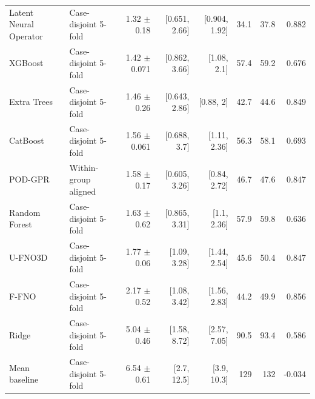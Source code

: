 \begin{landscape}
\begin{longtable}{p{3.8cm}p{2.9cm}rrrrrr}
Latent Neural Operator & Case-disjoint 5-fold & 1.32 $\pm$ 0.18 & [0.651, 2.66] & [0.904, 1.92] & 34.1 & 37.8 & 0.882 \\
XGBoost & Case-disjoint 5-fold & 1.42 $\pm$ 0.071 & [0.862, 3.66] & [1.08, 2.1] & 57.4 & 59.2 & 0.676 \\
Extra Trees & Case-disjoint 5-fold & 1.46 $\pm$ 0.26 & [0.643, 2.86] & [0.88, 2] & 42.7 & 44.6 & 0.849 \\
CatBoost & Case-disjoint 5-fold & 1.56 $\pm$ 0.061 & [0.688, 3.7] & [1.11, 2.36] & 56.3 & 58.1 & 0.693 \\
POD-GPR & Within-group aligned & 1.58 $\pm$ 0.17 & [0.605, 3.26] & [0.84, 2.72] & 46.7 & 47.6 & 0.847 \\
Random Forest & Case-disjoint 5-fold & 1.63 $\pm$ 0.62 & [0.865, 3.31] & [1.1, 2.36] & 57.9 & 59.8 & 0.636 \\
U-FNO3D & Case-disjoint 5-fold & 1.77 $\pm$ 0.06 & [1.09, 3.28] & [1.44, 2.54] & 45.6 & 50.4 & 0.847 \\
F-FNO & Case-disjoint 5-fold & 2.17 $\pm$ 0.52 & [1.08, 3.42] & [1.56, 2.83] & 44.2 & 49.9 & 0.856 \\
Ridge & Case-disjoint 5-fold & 5.04 $\pm$ 0.46 & [1.58, 8.72] & [2.57, 7.05] & 90.5 & 93.4 & 0.586 \\
Mean baseline & Case-disjoint 5-fold & 6.54 $\pm$ 0.61 & [2.7, 12.5] & [3.9, 10.3] & 129 & 132 & -0.034 \\
\bottomrule\end{longtable}\end{landscape}

